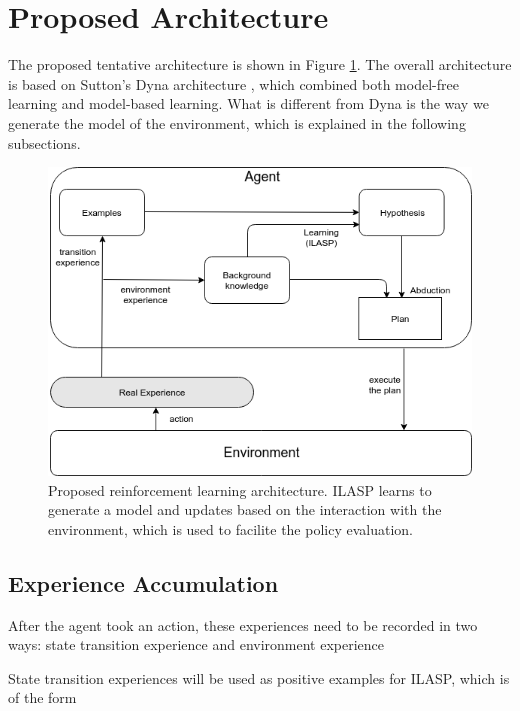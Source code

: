 \section{Proposed Architecture}
\label{proposed_architecture_section}

The proposed tentative architecture is shown in Figure \ref{proposed_architecture}. The overall architecture is based on Sutton's Dyna architecture \cite{Sutton1990}, which combined both model-free learning and model-based learning. What is different from Dyna is the way we generate the model of the environment, which is explained in the following subsections.

\begin{figure}[!htb]
\centering
\includegraphics[width=1.0\textwidth]{./figures/architecture}
\caption{Proposed reinforcement learning architecture. ILASP learns to generate a model and updates based on the interaction with the environment, which is used to facilite the policy evaluation. }
\label{proposed_architecture}
\end{figure}

\subsection{Experience Accumulation}
\label{experience_accumulation}

After the agent took an action, these experiences need to be recorded in two ways: state transition experience and environment experience

State transition experiences will be used as positive examples for ILASP, which is of the form

